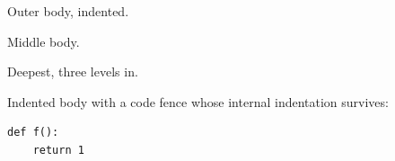 \begin{outerblock}
Outer body, indented.

\begin{middleblock}
Middle body.

\begin{innerblock}
Deepest, three levels in.
\end{innerblock}
\end{middleblock}
\end{outerblock}

\begin{note}
Indented body with a code fence whose internal indentation survives:

\begin{verbatim}
def f():
    return 1
\end{verbatim}
\end{note}

